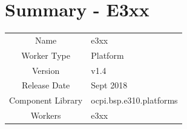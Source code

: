 \documentclass{article}
\author{} %
\date{Version \docVersion} %
\title{\docTitle}
\def\docVersion{1.4}
\def\comp{e3xx}
\def\Comp{e3xx Platform}
\def\comp{e3xx}
\def\Comp{E3xx}
\begin{document}
\section*{Summary - \Comp}
\begin{tabular}{|c|M{13.5cm}|}
	\hline
	                  &                                                    \\
	\hline
	Name              & \comp                                              \\
	\hline
	Worker Type       & Platform                                           \\
	\hline
	Version           & v\docVersion \\
	\hline
	Release Date      & Sept 2018 \\
	\hline
	Component Library & ocpi.bsp.e310.platforms                                \\
	\hline
	Workers & \comp                                        \\
	\hline
\end{tabular}
\end{document}
